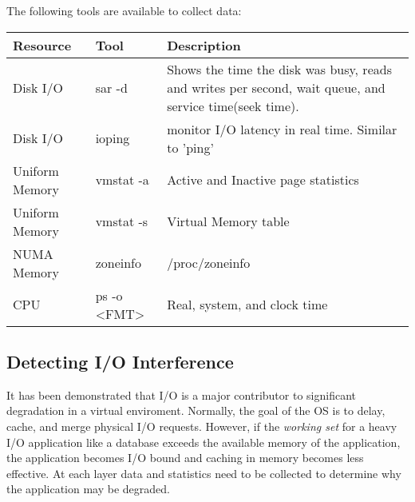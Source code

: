The following tools are available to collect data:
\begin{tabular}{ l l p{5cm} }
  Resource & Tool & Description \\
  \hline
  Disk I/O & sar -d & Shows the time the disk was busy, reads and writes per second, wait queue, and service time(seek time). \\
  Disk I/O & ioping & monitor I/O latency in real time. Similar to 'ping'\cite{oping}\\
  Uniform Memory & vmstat -a & Active and Inactive page statistics \\
  Uniform Memory & vmstat -s & Virtual Memory table \\
  NUMA Memory & zoneinfo & /proc/zoneinfo \\
  CPU & ps -o <FMT> & Real, system, and clock time \\
\end{tabular}

\begin{comment}
       To see every process with a user-defined format:
          ps -eo pid,tid,class,rtprio,ni,pri,psr,pcpu,stat,wchan:14,comm
          ps axo stat,euid,ruid,tty,tpgid,sess,pgrp,ppid,pid,pcpu,comm
          ps -eo pid,tt,user,fname,tmout,f,wchan

PROCESS STATE CODES
       Here are the different values that the s, stat and state output
       specifiers (header "STAT" or "S") will display to describe the state of
       a process:
       D    uninterruptible sleep (usually IO)
       R    running or runnable (on run queue)
       S    interruptible sleep (waiting for an event to complete)
       T    stopped, either by a job control signal or because it is being
            traced.
       W    paging (not valid since the 2.6.xx kernel)
       X    dead (should never be seen)
       Z    defunct ("zombie") process, terminated but not reaped by its
            parent.
      For BSD formats and when the stat keyword is used, additional
       characters may be displayed:
       <    high-priority (not nice to other users)
       N    low-priority (nice to other users)
       L    has pages locked into memory (for real-time and custom IO)
       s    is a session leader
       l    is multi-threaded (using CLONE_THREAD, like NPTL pthreads do)
       +    is in the foreground process group.
\end{comment}

\subsection{Detecting I/O Interference}
It has been demonstrated that I/O is a major contributor to significant degradation in a virtual enviroment.  Normally, the goal of the OS is to delay, cache, and merge physical I/O requests.  However, if the \emph{working set} for a heavy I/O application like a database exceeds the available memory of the application, the application becomes I/O bound and caching in memory becomes less effective.
At each layer data and statistics need to be collected to determine why the application may be degraded.
\newline

